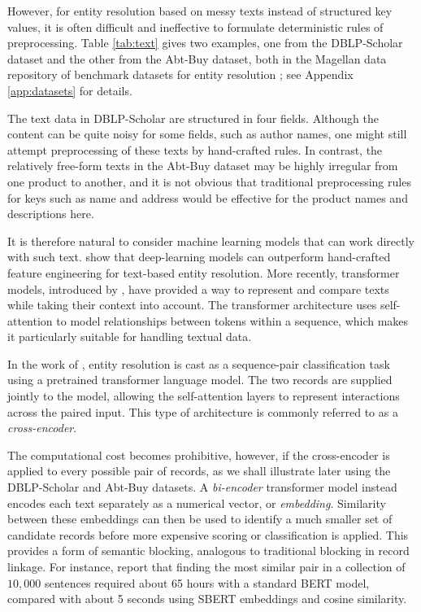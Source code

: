 However, for entity resolution based on messy texts instead of structured key values, it is often difficult and ineffective to formulate deterministic rules of preprocessing. Table \ref{tab:text} gives two examples, one from the DBLP-Scholar dataset and the other from the Abt-Buy dataset, both in the Magellan data repository of benchmark datasets for entity resolution \citep{konda2016magellan}; see Appendix \ref{app:datasets} for details.

The text data in DBLP-Scholar are structured in four fields. Although the content can be quite noisy for some fields, such as author names, one might still attempt preprocessing of these texts by hand-crafted rules. In contrast, the relatively free-form texts in the Abt-Buy dataset may be highly irregular from one product to another, and it is not obvious that traditional preprocessing rules for keys such as name and address would be effective for the product names and descriptions here.

It is therefore natural to consider machine learning models that can work directly with such text. \citet{mudgal2018deep} show that deep-learning models can outperform hand-crafted feature engineering for text-based entity resolution. More recently, transformer models, introduced by \citet{vaswani2017attention}, have provided a way to represent and compare texts while taking their context into account. The transformer architecture uses self-attention to model relationships between tokens within a sequence, which makes it particularly suitable for handling textual data.

In the work of \citet{li2020deep}, entity resolution is cast as a sequence-pair classification task using a pretrained transformer language model. The two records are supplied jointly to the model, allowing the self-attention layers to represent interactions across the paired input. This type of architecture is commonly referred to as a \emph{cross-encoder}.

The computational cost becomes prohibitive, however, if the cross-encoder is applied to every possible pair of records, as we shall illustrate later using the DBLP-Scholar and Abt-Buy datasets. A \emph{bi-encoder} transformer model \citep{reimers2019sentence, wang2022sudowoodo} instead encodes each text separately as a numerical vector, or \emph{embedding}. Similarity between these embeddings can then be used to identify a much smaller set of candidate records before more expensive scoring or classification is applied. This provides a form of semantic blocking, analogous to traditional blocking in record linkage. For instance, \citet{reimers2019sentence} report that finding the most similar pair in a collection of $10{,}000$ sentences required about 65 hours with a standard BERT model, compared with about 5 seconds using SBERT embeddings and cosine similarity.

